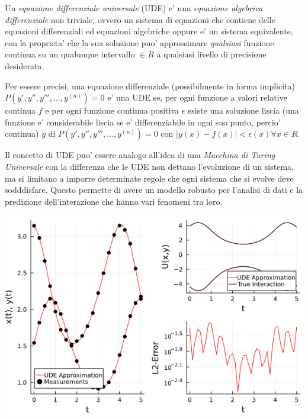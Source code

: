 Un \emph{equazione differenziale universale} (UDE) e' una \emph{equazione algebrica
differenziale}\cite{wiki:Differential-algebraic_system_of_equations} 
non triviale, ovvero un sistema di equazioni che contiene delle equazioni differenziali
ed equazioni algebriche oppure e' un sistema equivalente,
con la proprieta' che la sua soluzione puo' approssimare
\emph{qualsiasi} funzione continua su un qualunque intervallo $\in R$ a 
qualsiasi livello di precisione desiderata. \cite{wiki:Universal_differential_equation}

Per essere precisi, una equazione differenziale (possibilmente in forma implicita)
$P( y', y'', y''', ..., y^{(n)})=0$ e' una UDE se, per ogni funzione a valori relative
continua $f$ e per ogni funzione continua positiva $\epsilon$ esiste una 
soluzione liscia\cite{wiki:Smoothness} (una funzione e' considerabile liscia se e' 
differenziabile in ogni suo punto, percio' continua) $y$ di $P( y', y'', y''', ..., y^{(n)})=0$
con $|y(x) - f(x)| < \epsilon(x) \forall x \in R$.

Il concetto di UDE puo' essere analogo all'idea di una \emph{Macchina di Turing Universale}
\cite{wiki:Universal_Turing_machine} con la differenza che le UDE non dettano 
l'evoluzione di un sistema, ma si limitano a imporre determinate regole che 
ogni sistema che si evolve deve sodddisfare. Questo permette di avere un modello robusto 
per l'analisi di dati e la predizione dell'interazione che hanno vari fenomeni tra loro.

\begin{minipage}{\linewidth}
    \centering
    \includegraphics[scale=0.7]{img/ude_approx.png}
    \label{fig:UDE_approx}
\end{minipage}

